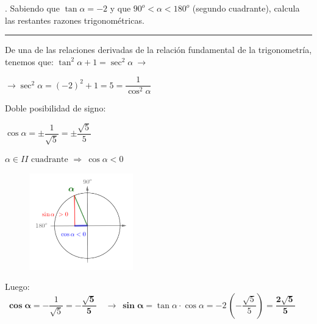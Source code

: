 \begin{miejercicio}
. Sabiendo que $\tan \alpha=-2$ y que $90^o<\alpha <180^o$ \textcolor{gris}{(segundo cuadrante)}, calcula las restantes razones trigonométricas. 

\rule{250pt}{0.1pt}	


\vspace{5mm} \begin{multicols}{2}
De una de las relaciones derivadas de la relación fundamental de la trigonometría, tenemos que:
$\tan^2 \alpha + 1 = \sec^2 \alpha \ \to \ $

\vspace{2mm} $\to \sec^2 \alpha=(-2)^2+1=5=\dfrac{1}{\cos ^2 \alpha}$

\vspace{2mm} Doble posibilidad de signo: 

\vspace{2mm} $\cos \alpha=\pm \dfrac 1 {\sqrt{5}}=\pm \dfrac{\sqrt{5}}{5}$

\vspace{2mm} $\alpha \in II \text{ cuadrante } \Rightarrow \ \cos \alpha < 0$
 \begin{figure}[H]
	\centering
	\includegraphics[width=0.4\textwidth]{img-rt/rt16.png}
\end{figure}
\end{multicols}
Luego: $\ \boldsymbol{\cos \alpha}=	- \dfrac {1}{\sqrt{5}}= \boldsymbol{-\dfrac{\sqrt{5}}{5}} \quad \to \ \boldsymbol{\sin \alpha} =\tan \alpha \cdot \cos \alpha = -2\, \left( - \dfrac{\sqrt{5}}{5}  \right) = \boldsymbol{\dfrac{2\sqrt{5}}{5}}$
\end{miejercicio}



